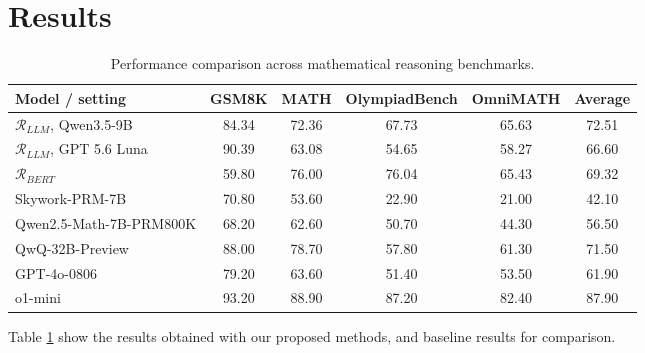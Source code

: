 \section{Results}
\label{sec:results}

\begin{table}[ht]
\centering
\begin{tabular}{lccccc}
\hline
\textbf{Model / setting} & \textbf{GSM8K} & \textbf{MATH} & \textbf{OlympiadBench} & \textbf{OmniMATH} & \textbf{Average} \\
\hline
$\mathcal{R}_{LLM}$, Qwen3.5-9B & 84.34 & 72.36 & 67.73 & 65.63 & 72.51 \\
$\mathcal{R}_{LLM}$, GPT 5.6 Luna & 90.39 & 63.08 & 54.65 & 58.27 & 66.60 \\
$\mathcal{R}_{BERT}$ & 59.80 & 76.00 & 76.04 & 65.43 & 69.32 \\
\midrule
Skywork-PRM-7B & 70.80 & 53.60 & 22.90 & 21.00 & 42.10 \\
Qwen2.5-Math-7B-PRM800K & 68.20 & 62.60 & 50.70 & 44.30 & 56.50 \\
QwQ-32B-Preview & 88.00 & 78.70 & 57.80 & 61.30 & 71.50 \\
GPT-4o-0806 & 79.20 & 63.60 & 51.40 & 53.50 & 61.90 \\
o1-mini & 93.20 & 88.90 & 87.20 & 82.40 & 87.90 \\
\hline
\end{tabular}
\caption{Performance comparison across mathematical reasoning benchmarks.}
\label{tab:benchmark_results}
\end{table}



Table \ref{tab:benchmark_results} show the results obtained with our proposed methods, and baseline results for comparison. 

